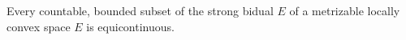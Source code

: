 Every countable, bounded subset of the strong bidual $E$ of a metrizable locally convex space $E$ is equicontinuous.